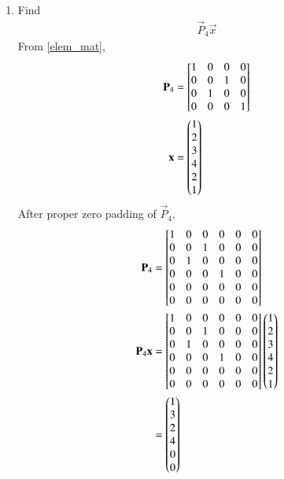 \documentclass[journal,12pt,twocolumn]{IEEEtran}
\renewcommand\thesection{\arabic{section}}
\begin{document}
\begin{enumerate}[label=\arabic*.,ref=\thesection.\theenumi]
	\item Find 
	\begin{align}
		\vec{P}_4 \vec{x}
	\end{align}
\solution
   From \eqref{elem_mat},
   \begin{align}
   	\mathbf{P}_4&=\begin{bmatrix}
   		1&0&0&0\\0&0&1&0\\0&1&0&0\\0&0&0&1
   	\end{bmatrix}\\
   	\mathbf{x}&=\begin{pmatrix}1\\2\\3\\4\\2\\1\end{pmatrix}
   \end{align}
   After proper zero padding of $\vec{P}_4$,
   \begin{align}
   	\mathbf{P}_4&=\begin{bmatrix}
   		1&0&0&0&0&0\\0&0&1&0&0&0\\0&1&0&0&0&0\\0&0&0&1&0&0\\0&0&0&0&0&0\\0&0&0&0&0&0
   	\end{bmatrix}\\
   	\mathbf{P}_4 \mathbf{x}&=\begin{bmatrix}
   		1&0&0&0&0&0\\0&0&1&0&0&0\\0&1&0&0&0&0\\0&0&0&1&0&0\\0&0&0&0&0&0\\0&0&0&0&0&0
   	\end{bmatrix}\begin{pmatrix}1\\2\\3\\4\\2\\1\end{pmatrix}\\
   	&=\begin{pmatrix}1\\3\\2\\4\\0\\0\end{pmatrix}
   \end{align}


\end{enumerate}
\end{document}
